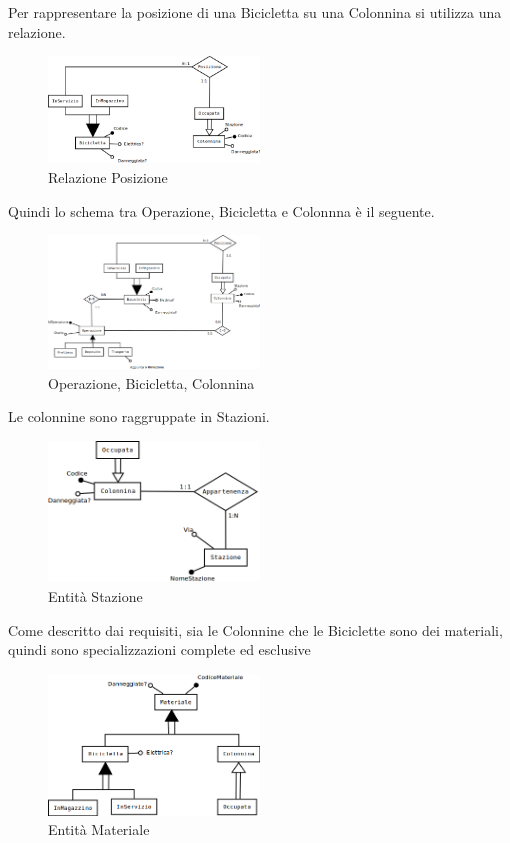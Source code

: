 \documentclass[a4paper,twoside]{article}
\begin{document}
Per rappresentare la posizione di una Bicicletta su una Colonnina si utilizza una relazione.
\begin{figure}[H]
 \centering
  \includegraphics[width=0.5\textwidth]{Immagini-Grafici/Concettuale09.png}
\caption{Relazione Posizione}
\end{figure}
Quindi lo schema tra Operazione, Bicicletta e Colonnna è il seguente.
\begin{figure}[H]
 \centering
  \includegraphics[width=0.5\textwidth]{Immagini-Grafici/Concettuale10.png}
\caption{Operazione, Bicicletta, Colonnina}
\end{figure}
Le colonnine sono raggruppate in Stazioni.
\begin{figure}[H]
 \centering
  \includegraphics[width=0.5\textwidth]{Immagini-Grafici/Concettuale11.png}
\caption{Entità Stazione}
\end{figure}
Come descritto dai requisiti, sia le Colonnine che le Biciclette sono dei materiali, quindi sono specializzazioni complete ed esclusive
\begin{figure}[H]
 \centering
  \includegraphics[width=0.5\textwidth]{Immagini-Grafici/Concettuale12.png}
\caption{Entità Materiale}
\end{figure}
\end{document}
